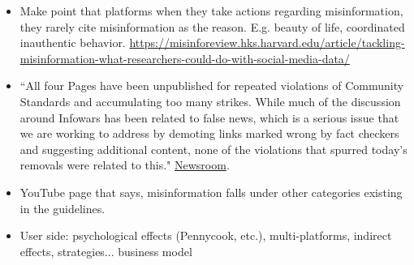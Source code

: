 \documentclass{article}
\begin{document}
{\begin{itemize}
\begin{itemize}
		\item Make point that platforms when they take actions regarding misinformation, they rarely cite misinformation as the reason. E.g. beauty of life, coordinated inauthentic behavior. \href{https://misinforeview.hks.harvard.edu/article/tackling-misinformation-what-researchers-could-do-with-social-media-data/}{https://misinforeview.hks.harvard.edu/article/tackling-misinformation-what-researchers-could-do-with-social-media-data/}
		
		\item ``All four Pages have been unpublished for repeated violations of Community Standards and accumulating too many strikes. While much of the discussion around Infowars has been related to false news, which is a serious issue that we are working to address by demoting links marked wrong by fact checkers and suggesting additional content, none of the violations that spurred today’s removals were related to this." \href{https://about.fb.com/news/2018/08/enforcing-our-community-standards/}{Newsroom}.
		
		\item YouTube page that says, misinformation falls under other categories existing in the guidelines. 
		
		\item User side: psychological effects (Pennycook, etc.), multi-platforms, indirect effects, strategies... business model 

	\end{itemize}
	
\end{itemize}
}



\end{document}

